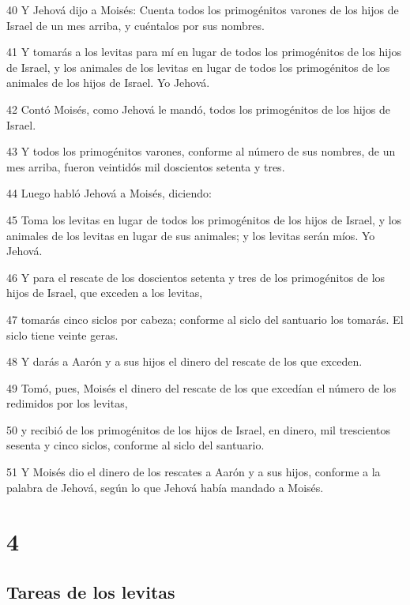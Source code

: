 \par 40 Y Jehová dijo a Moisés: Cuenta todos los primogénitos varones de los hijos de Israel de un mes arriba, y cuéntalos por sus nombres.
\par 41 Y tomarás a los levitas para mí en lugar de todos los primogénitos de los hijos de Israel, y los animales de los levitas en lugar de todos los primogénitos de los animales de los hijos de Israel. Yo Jehová.
\par 42 Contó Moisés, como Jehová le mandó, todos los primogénitos de los hijos de Israel.
\par 43 Y todos los primogénitos varones, conforme al número de sus nombres, de un mes arriba, fueron veintidós mil doscientos setenta y tres.
\par 44 Luego habló Jehová a Moisés, diciendo:
\par 45 Toma los levitas en lugar de todos los primogénitos de los hijos de Israel, y los animales de los levitas en lugar de sus animales; y los levitas serán míos. Yo Jehová.
\par 46 Y para el rescate de los doscientos setenta y tres de los primogénitos de los hijos de Israel, que exceden a los levitas,
\par 47 tomarás cinco siclos   por cabeza; conforme al siclo del santuario los tomarás. El siclo tiene veinte geras.
\par 48 Y darás a Aarón y a sus hijos el dinero del rescate de los que exceden.
\par 49 Tomó, pues, Moisés el dinero del rescate de los que excedían el número de los redimidos por los levitas,
\par 50 y recibió de los primogénitos de los hijos de Israel, en dinero, mil trescientos sesenta y cinco siclos,  conforme al siclo del santuario.
\par 51 Y Moisés dio el dinero de los rescates a Aarón y a sus hijos, conforme a la palabra de Jehová, según lo que Jehová había mandado a Moisés.

\chapter{4}

\section*{Tareas de los levitas }

